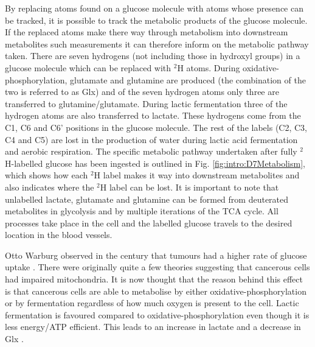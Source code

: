 By replacing atoms found on a glucose molecule with atoms whose presence can be tracked, it is possible to track the metabolic products of the glucose molecule. If the replaced atoms make there way through metabolism into downstream metabolites such measurements it can therefore inform on the metabolic pathway taken. There are seven hydrogens (not including those in hydroxyl groups) in a glucose molecule which can be replaced with $^2$H atoms. During oxidative-phosphorylation, glutamate and glutamine are produced (the combination of the two is referred to as Glx) and of the seven hydrogen atoms only three are transferred to glutamine/glutamate. During lactic fermentation three of the hydrogen atoms are also transferred to lactate. These hydrogens come from the C1, C6 and C6' positions in the glucose molecule. The rest of the labels (C2, C3, C4 and C5) are lost in the production of water during lactic acid fermentation and aerobic respiration. The specific metabolic pathway undertaken after fully $^2$H-labelled glucose has been ingested is outlined in Fig. \ref{fig:intro:D7Metabolism}, which shows how each $^2$H label makes it way into downstream metabolites and also indicates where the $^2$H label can be lost. It is important to note that unlabelled lactate, glutamate and glutamine can be formed from deuterated metabolites in glycolysis and by multiple iterations of the \ac{TCA} cycle. All processes take place in the cell and the labelled glucose travels to the desired location in the blood vessels.

Otto Warburg observed in the  century that tumours had a higher rate of glucose uptake \cite{WarburgBerlin-Dahlem1925TheCells,Warburg1956OnCells}. There were originally quite a few theories suggesting that cancerous cells had impaired mitochondria. It is now thought that the reason behind this effect is that cancerous cells are able to metabolise by either oxidative-phosphorylation or by fermentation regardless of how much oxygen is present to the cell. Lactic fermentation is favoured compared to oxidative-phosphorylation even though it is less energy/\ac{ATP} efficient. This leads to an increase in lactate and a decrease in Glx \cite{Romero-Garcia2011TumorView}.

